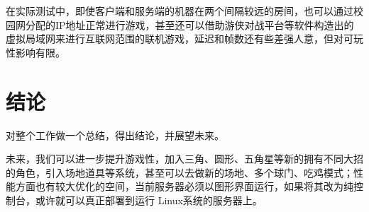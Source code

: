 \documentclass[conference]{IEEEtran}
\begin{document}
  在实际测试中，即使客户端和服务端的机器在两个间隔较远的房间，也可以通过校园网分配的IP地址正常进行游戏，甚至还可以借助游侠对战平台等软件构造出的虚拟局域网来进行互联网范围的联机游戏，延迟和帧数还有些差强人意，但对可玩性影响有限。

\section{结论}
对整个工作做一个总结，得出结论，并展望未来。

未来，我们可以进一步提升游戏性，加入三角、圆形、五角星等新的拥有不同大招的角色，引入场地道具等系统，甚至可以去做新的场地、多个球门、吃鸡模式；性能方面也有较大优化的空间，当前服务器必须以图形界面运行，如果将其改为纯控制台，或许就可以真正部署到运行 Linux系统的服务器上。




\end{document}
